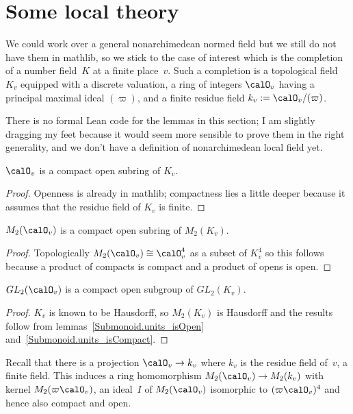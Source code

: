 \section{Some local theory}

We could work over a general nonarchimedean normed field but we still do not have them
in mathlib, so we stick to the case of interest which is the completion of a number
field~$K$ at a finite place~$v$. Such a completion is a topological field~$K_v$
equipped with a discrete valuation, a ring of integers $\calO_v$ having a principal
maximal ideal $(\varpi)$, and a finite residue field $k_v:=\calO_v/(\varpi)$.

There is no formal Lean code for the lemmas in this section; I am slightly dragging my
feet because it would seem more sensible to prove them in the right generality,
and we don't have a definition of nonarchimedean local field yet.

\begin{lemma}
  \label{nolean-compactopen}
  $\calO_v$ is a compact open subring of $K_v$.
\end{lemma}
\begin{proof} Openness is already in mathlib; compactness lies a little deeper because it
  assumes that the residue field of $K_v$ is finite.
\end{proof}

\begin{lemma} $M_2(\calO_v)$ is a compact open subring of $M_2(K_v)$.
  \label{nolean-compactopen-matrix}
\end{lemma}
\begin{proof}
  Topologically $M_2(\calO_v)\cong \calO_v^4$ as a subset of $K_v^4$ so this
  follows because a product of compacts is compact and a product of opens is open.
\end{proof}

\begin{lemma} $GL_2(\calO_v)$ is a compact open subgroup of $GL_2(K_v)$.
  \label{nolean-compactopen-GL2}
\end{lemma}
\begin{proof}
  $K_v$ is known to be Hausdorff, so $M_2(K_v)$ is Hausdorff and the
  results follow from lemmas~\ref{Submonoid.units_isOpen} and~\ref{Submonoid.units_isCompact}.
\end{proof}

Recall that there is a projection $\calO_v\to k_v$ where $k_v$ is the residue
field of~$v$, a finite field. This induces a ring homomorphism $M_2(\calO_v)\to M_2(k_v)$
with kernel $M_2(\varpi\calO_v)$, an ideal~$I$ of $M_2(\calO_v)$ isomorphic to $(\varpi\calO_v)^4$
and hence also compact and open.

